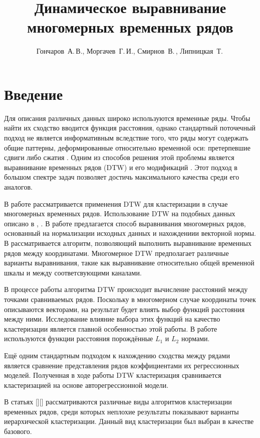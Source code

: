 \documentclass[12pt,twoside]{article}
\title
        {Динамическое выравнивание многомерных временных рядов}
\author
        {Гончаров~А.\,В., Моргачев~Г.\,И., Смирнов~В.\,, Липницкая~Т.\,} %
\begin{document}
    \maketitle
    \section{Введение}
				
				Для описания различных данных широко используются временные ряды. Чтобы найти их сходство вводится функция расстояния, однако стандартный поточечный подход не является информативным вследствие того, что ряды могут содержать общие паттерны, деформированные относительно временной оси: претерпевшие сдвиги либо сжатия \cite{01f4ab11a9ff49ff909094a135dcfe33}. Одним из способов решения этой проблемы является выравнивание временных рядов (DTW)  \cite{Keogh01derivativedynamic} и его модификаций \cite{journals/ida/SalvadorC07}. Этот подход в большом спектре задач позволяет достичь максимального качества среди его аналогов.
				
				В работе рассматривается применения DTW для кластеризации в случае многомерных временных рядов.
				Использование DTW на подобных данных описано в \cite{Holt2007}, \cite{Sanguansat2012MultipleMS}. В работе \cite{Holt2007} предлагается способ выравнивания многомерных рядов, основанный на нормализации исходных данных и нахождениии векторной нормы. В \cite{Sanguansat2012MultipleMS} рассматривается алгоритм, позволяющий выполнить выравнивание временных рядов между координатами. 
				Многомерное DTW предполагает различные варианты выравнивания, такие как выравнивание относительно общей временной шкалы и между соответсвующими каналами.
				
				В процессе работы алгоритма DTW происходит вычисление расстояний между точками сравниваемых рядов. Поскольку в многомерном случае координаты точек описываются векторами, на результат будет влиять выбор функций расстояния между ними. Исследование влияние выбора этих функций на качество кластеризации является главной особенностью этой работы. В работе используются функции расстояния порождённые $L_1$ и $L_2$ нормами.
				
				Ещё одним стандартным подходом к нахождению сходства между рядами является сравнение представления рядов коэффициентами их регрессионных моделей. Полученная в ходе работы DTW кластеризация сравнивается кластеризацией на основе авторегрессионной модели.
			
				В статьях [][] рассматриваются различные виды алгоритмов кластеризации временных рядов, среди которых неплохие результаты показывают варианты иерархической кластеризации. Данный вид кластеризации был выбран в качестве базового.
				
\end{document}
